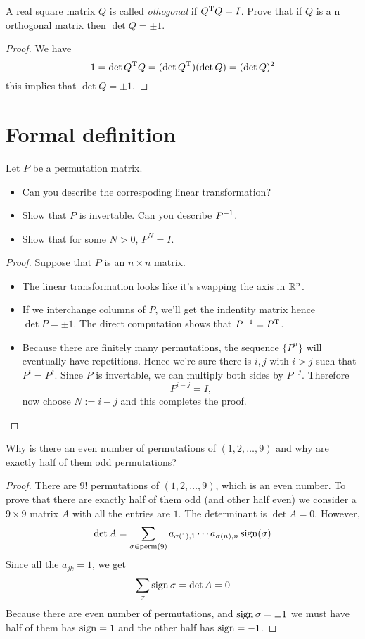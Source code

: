 \begin{exercise}
  A real square matrix $Q$ is called \emph{othogonal} if 
  $Q^\mathrm{T} Q=I$. Prove that if $Q$ is a n orthogonal matrix
  then $\det Q=\pm 1$.
\end{exercise}
\begin{proof}
  We have
  \[ 1=\det Q^\mathrm{T} Q=(\det Q^\mathrm{T})(\det Q)=(\det Q)^2 \]
  this implies that $\det Q=\pm 1.$
\end{proof}

\section{Formal definition}
\setcounter{exercise}{1}
\begin{exercise}
  Let $P$ be a permutation matrix.
  \begin{itemize}
    \item Can you describe the correspoding linear
      transformation?
    \item Show that $P$ is invertable. Can you describe $P^{-1}$.
    \item Show that for some $N>0$, $P^N=I$.
  \end{itemize}
\end{exercise}
\begin{proof}
  Suppose that $P$ is an $n\times n$ matrix.
  \begin{itemize}
    \item The linear transformation looks like it's swapping 
      the axis in $\mathbb R^n$.
    \item If we interchange columns of $P$, we'll get the indentity
      matrix hence $\det P=\pm 1$. The direct computation shows that
      $P^{-1} =P^\mathrm{T}$.
    \item Because there are finitely many permutations, the sequence
      $\{P^n\}$ will eventually have repetitions. Hence we're sure 
      there is $i,j$ with $i>j$ such that $P^i=P^j$. Since $P$ is 
      invertable, we can multiply both sides by $P^{-j}$. Therefore
      \[P^{i-j}=I,\]
      now choose $N:=i-j$ and this completes the proof.
  \end{itemize}
\end{proof}
\begin{exercise}
  Why is there an even number of permutations of $(1,2,\dots,9)$
  and why are exactly half of them odd permutations?
\end{exercise}
\begin{proof}
  There are $9!$ permutations of $(1,2,\dots,9)$, which is an even 
  number. To prove that there are exactly half of them odd 
  (and other half even) we consider a $9\times 9$ matrix $A$ with all 
  the entries are $1$. The determinant is $\det A=0$. However,
  \[
    \det A=\sum_{\sigma\in\operatorname{perm}(9)}
    a_{\sigma(1),1}\cdots a_{\sigma(n),n}\operatorname{sign}(\sigma)
  \]
  Since all the $a_{jk}=1$, we get 
  \[\sum_{\sigma}\operatorname{sign}\sigma=\det A=0\]
  Because there are even number of permutations, and
  $\operatorname{sign}\sigma=\pm 1$ we must have half of them has $\operatorname{sign}=1$ and
  the other half has $\operatorname{sign}=-1$.
\end{proof}

